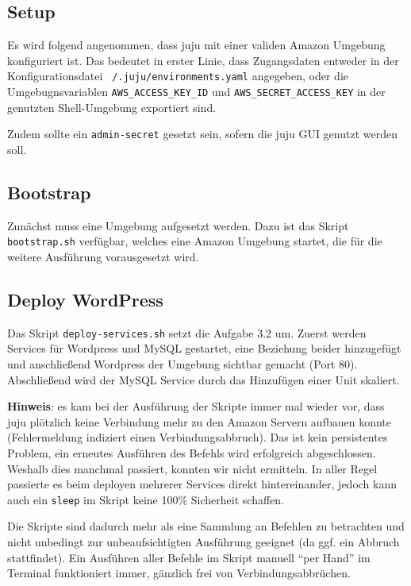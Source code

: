 
\subsection{Setup}

Es wird folgend angenommen, dass juju mit einer validen Amazon Umgebung konfiguriert ist.
Das bedeutet in erster Linie, dass Zugangsdaten entweder in der Konfigurationsdatei \texttt{~/.juju/environments.yaml} angegeben, oder die Umgebugnsvariablen \texttt{AWS_ACCESS_KEY_ID} und \texttt{AWS_SECRET_ACCESS_KEY} in der genutzten Shell-Umgebung exportiert sind.

Zudem sollte ein \texttt{admin-secret} gesetzt sein, sofern die juju GUI genutzt werden soll.


\subsection{Bootstrap}

Zunächst muss eine Umgebung aufgesetzt werden.
Dazu ist das Skript \texttt{bootstrap.sh} verfügbar, welches eine Amazon Umgebung startet, die für die weitere Ausführung vorausgesetzt wird.


\subsection{Deploy WordPress}

Das Skript \texttt{deploy-services.sh} setzt die Aufgabe 3.2 um.
Zuerst werden Services für Wordpress und MySQL gestartet, eine Beziehung beider hinzugefügt und anschließend Wordpress der Umgebung sichtbar gemacht (Port 80).
Abschließend wird der MySQL Service durch das Hinzufügen einer Unit skaliert.

\textbf{Hinweis}: es kam bei der Ausführung der Skripte immer mal wieder vor, dass juju plötzlich keine Verbindung mehr zu den Amazon Servern aufbauen konnte (Fehlermeldung indiziert einen Verbindungsabbruch).
Das ist kein persistentes Problem, ein erneutes Ausführen des Befehls wird erfolgreich abgeschlossen.
Weshalb dies manchmal passiert, konnten wir nicht ermitteln.
In aller Regel passierte es beim deployen mehrerer Services direkt hintereinander, jedoch kann auch ein \texttt{sleep} im Skript keine 100\% Sicherheit schaffen.

Die Skripte sind dadurch mehr als eine Sammlung an Befehlen zu betrachten und nicht unbedingt zur unbeaufsichtigten Ausführung geeignet (da ggf. ein Abbruch stattfindet).
Ein Ausführen aller Befehle im Skript manuell \enquote{per Hand} im Terminal funktioniert immer, gänzlich frei von Verbindungsabbrüchen.


